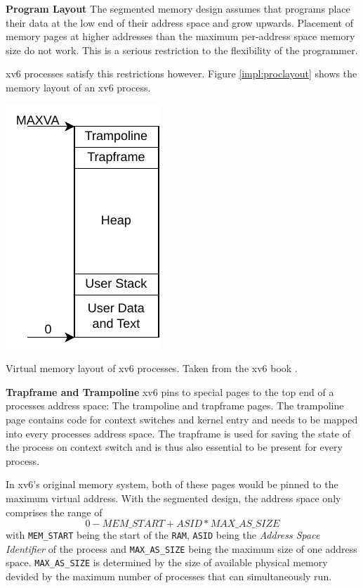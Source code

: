 \textbf{Program Layout} The segmented memory design assumes that programs place their data at the low end of their address
space and grow upwards.
Placement of memory pages at higher addresses than the maximum per-address space memory size do not work. This is a serious restriction to the flexibility of the programmer.

xv6 processes satisfy this restrictions however. Figure \ref{impl:proclayout} shows the memory layout
of an xv6 process.

\begin{marginfigure}
    \centering
    \includegraphics[scale=.8]{figures/prog_vm.pdf}
    \caption[xv6 memory layout]{Virtual memory layout of xv6 processes. Taken from the xv6 book \cite{cox2011xv6}.}
    \label{impl:proclayout}
\end{marginfigure}


\textbf{Trapframe and Trampoline} xv6 pins to special pages to the top end of a processes address space: The trampoline and trapframe pages.
The trampoline page contains code for context switches and kernel entry and needs to be mapped
into every processes address space.
The trapframe is used for saving the state of the process on context switch and is thus also essential to be present for every process.

In xv6's original memory system, both of these pages would be pinned to the maximum virtual address.
With the segmented design, the address space only comprises the range of \[
    0 - MEM\_START+ASID*MAX\_AS\_SIZE
\]
with \texttt{MEM\_START} being the start of the \texttt{RAM}, \texttt{ASID} being the \emph{Address Space Identifier} of the process and \texttt{MAX\_AS\_SIZE} being the maximum size of one address space.
\texttt{MAX\_AS\_SIZE} is determined by the size of available physical memory devided by the maximum
number of processes that can simultaneously run.

